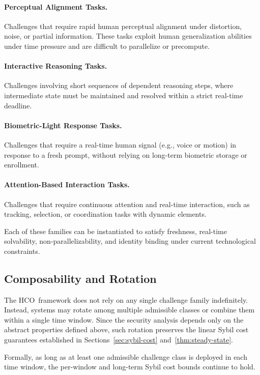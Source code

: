 \documentclass[11pt]{article}
\newcommand{\HCO}{HCO\xspace}
\begin{document}
\paragraph{Perceptual Alignment Tasks.}
Challenges that require rapid human perceptual alignment under distortion, noise, or partial information. These tasks exploit human generalization abilities under time pressure and are difficult to parallelize or precompute.

\paragraph{Interactive Reasoning Tasks.}
Challenges involving short sequences of dependent reasoning steps, where intermediate state must be maintained and resolved within a strict real-time deadline.

\paragraph{Biometric-Light Response Tasks.}
Challenges that require a real-time human signal (e.g., voice or motion) in response to a fresh prompt, without relying on long-term biometric storage or enrollment.

\paragraph{Attention-Based Interaction Tasks.}
Challenges that require continuous attention and real-time interaction, such as tracking, selection, or coordination tasks with dynamic elements.

Each of these families can be instantiated to satisfy freshness, real-time solvability, non-parallelizability, and identity binding under current technological constraints.

\subsection{Composability and Rotation}

The \HCO\ framework does not rely on any single challenge family indefinitely. Instead, systems may rotate among multiple admissible classes or combine them within a single time window. Since the security analysis depends only on the abstract properties defined above, such rotation preserves the linear Sybil cost guarantees established in Sections~\ref{sec:sybil-cost} and~\ref{thm:steady-state}.

Formally, as long as at least one admissible challenge class is deployed in each time window, the per-window and long-term Sybil cost bounds continue to hold.
\end{document}
